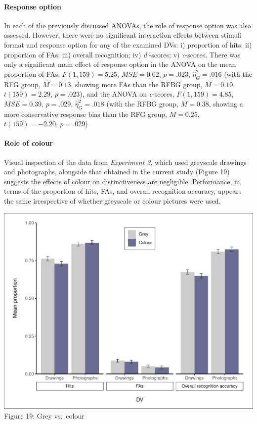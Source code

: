 \documentclass[
  11pt,
]{article}
\begin{document}
\hypertarget{response-option}{%
\paragraph{Response option}\label{response-option}}

In each of the previously discussed ANOVAs, the role of response option
was also assessed. However, there were no significant interaction
effects between stimuli format and response option for any of the
examined DVs: i) proportion of hits; ii) proportion of FAs; iii) overall
recognition; iv) \emph{d'}-scores; v) \emph{c}-scores. There was only a
significant main effect of response option in the ANOVA on the mean
proportion of FAs, \(F(1, 159) = 5.25\), \(\mathit{MSE} = 0.02\),
\(p = .023\), \(\hat{\eta}^2_G = .016\) (with the RFG group,
\(M = 0.13\), showing more FAs than the RFBG group, \(M = 0.10\),
\(t(159) = 2.29\), \(p = .023\)), and the ANOVA on \emph{c}-scores,
\(F(1, 159) = 4.85\), \(\mathit{MSE} = 0.39\), \(p = .029\),
\(\hat{\eta}^2_G = .018\) (with the RFBG group, \(M = 0.38\), showing a
more conservative response bias than the RFG group, \(M = 0.25\),
\(t(159) = -2.20\), \(p = .029\))

\hypertarget{role-of-colour}{%
\paragraph{Role of colour}\label{role-of-colour}}

Visual inspection of the data from \emph{Experiment 3}, which used
greyscale drawings and photographs, alongside that obtained in the
current study (Figure 19) suggests the effects of colour on
distinctiveness are negligible. Performance, in terms of the proportion
of hits, FAs, and overall recognition accuracy, appears the same
irrespective of whether greyscale or colour pictures were used.

\includegraphics{R--Thesis_files/figure-latex/unnamed-chunk-57-1.pdf}
Figure 19: Grey vs.~colour
\end{document}
